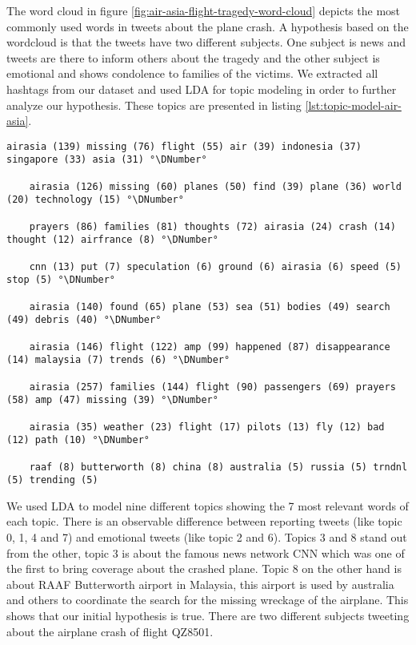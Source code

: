 The word cloud in figure \ref{fig:air-asia-flight-tragedy-word-cloud} depicts the most commonly used words in tweets about the plane crash. A hypothesis based on the wordcloud is that the tweets have two different subjects. One subject is news and tweets are there to inform others about the tragedy and the other subject is emotional and shows condolence to families of the victims.
We extracted all hashtags from our dataset and used LDA for topic modeling in order to further analyze our hypothesis. These topics are presented in listing \ref{lst:topic-model-air-asia}.

\begin{lstlisting}[caption={[Topic Model for Air Asia Flight Tragedy] Topic Model for Air Asia Flight Tragedy}, label={lst:topic-model-air-asia}, float=h]
	airasia (139) missing (76) flight (55) air (39) indonesia (37) singapore (33) asia (31) °\DNumber°

	airasia (126) missing (60) planes (50) find (39) plane (36) world (20) technology (15) °\DNumber°

	prayers (86) families (81) thoughts (72) airasia (24) crash (14) thought (12) airfrance (8) °\DNumber°

	cnn (13) put (7) speculation (6) ground (6) airasia (6) speed (5) stop (5) °\DNumber°

	airasia (140) found (65) plane (53) sea (51) bodies (49) search (49) debris (40) °\DNumber°

	airasia (146) flight (122) amp (99) happened (87) disappearance (14) malaysia (7) trends (6) °\DNumber°

	airasia (257) families (144) flight (90) passengers (69) prayers (58) amp (47) missing (39) °\DNumber°

	airasia (35) weather (23) flight (17) pilots (13) fly (12) bad (12) path (10) °\DNumber°

	raaf (8) butterworth (8) china (8) australia (5) russia (5) trndnl (5) trending (5)
\end{lstlisting}

We used LDA to model nine different topics showing the 7 most relevant words of each topic. There is an observable difference between reporting tweets (like topic 0, 1, 4 and 7) and emotional tweets (like topic 2 and 6). Topics 3 and 8 stand out from the other, topic 3 is about the famous news network CNN which was one of the first to bring coverage about the crashed plane. Topic 8 on the other hand is about RAAF Butterworth airport in Malaysia, this airport is used by australia and others to coordinate the search for the missing wreckage of the airplane.
This shows that our initial hypothesis is true. There are two different subjects tweeting about the airplane crash of flight QZ8501.

